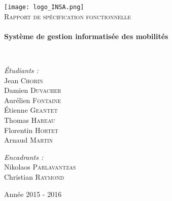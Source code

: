 \begin{titlepage}
        \begin{sffamily}
            \begin{center}

                \texttt{[image: logo\_INSA.png]}~\\[2.5cm]

                \textsc{\huge Rapport de spécification fonctionnelle}\\[2.5cm]

                \HRule \\[0.4cm]
                { \huge \bfseries Système de gestion informatisée des mobilités\\[0.4cm] }

                \HRule \\[4cm]

                \begin{minipage}{0.4\textwidth}
                    \begin{flushleft} \large
                        \emph{Étudiants :}\\
                        Jean \textsc{Chorin}\\
                        Damien \textsc{Duvacher}\\
                        Aurélien \textsc{Fontaine}\\
                        Étienne \textsc{Geantet}\\
                        Thomas \textsc{Hareau}\\
                        Florentin \textsc{Hortet}\\
                        Arnaud \textsc{Martin}\\
                    \end{flushleft}
                \end{minipage}
                \begin{minipage}{0.5\textwidth}
                    \begin{flushright} \large
                        \emph{Encadrants :} \\
                        Nikolaos \textsc{Parlavantzas}\\
                        Christian \textsc{Raymond}
                    \end{flushright}
                \end{minipage}

                \vfill

                {\large Année 2015 - 2016}

            \end{center}
        \end{sffamily}
    \end{titlepage}
